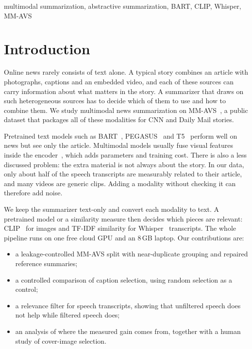 \documentclass[conference]{IEEEtran}
\begin{document}
\begin{IEEEkeywords}
multimodal summarization, abstractive summarization, BART, CLIP, Whisper, MM-AVS
\end{IEEEkeywords}

\section{Introduction}
Online news rarely consists of text alone. A typical story combines an article with photographs, captions and an embedded video, and each of these sources can carry information about what matters in the story. A summarizer that draws on such heterogeneous sources has to decide which of them to use and how to combine them. We study multimodal news summarization on MM-AVS~\cite{fu2021mmavs}, a public dataset that packages all of these modalities for CNN and Daily Mail stories.

Pretrained text models such as BART~\cite{lewis2020bart}, PEGASUS~\cite{zhang2020pegasus} and T5~\cite{raffel2020t5} perform well on news but see only the article. Multimodal models usually fuse visual features inside the encoder~\cite{yu2021vgbart,liang2023sov}, which adds parameters and training cost. There is also a less discussed problem: the extra material is not always about the story. In our data, only about half of the speech transcripts are measurably related to their article, and many videos are generic clips. Adding a modality without checking it can therefore add noise.

We keep the summarizer text-only and convert each modality to text. A pretrained model or a similarity measure then decides which pieces are relevant: CLIP~\cite{radford2021clip} for images and TF-IDF similarity for Whisper~\cite{radford2023whisper} transcripts. The whole pipeline runs on one free cloud GPU and an 8\,GB laptop. Our contributions are:
\begin{itemize}
\item a leakage-controlled MM-AVS split with near-duplicate grouping and repaired reference summaries;
\item a controlled comparison of caption selection, using random selection as a control;
\item a relevance filter for speech transcripts, showing that unfiltered speech does not help while filtered speech does;
\item an analysis of where the measured gain comes from, together with a human study of cover-image selection.
\end{itemize}
\end{document}
